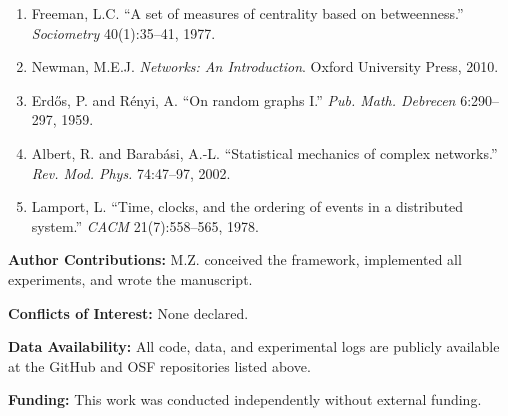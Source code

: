 \documentclass[11pt]{article}
\begin{document}
\begin{enumerate}
    \item Freeman, L.C. ``A set of measures of centrality based on betweenness.'' \emph{Sociometry} 40(1):35--41, 1977.
    \item Newman, M.E.J. \emph{Networks: An Introduction}. Oxford University Press, 2010.
    \item Erd\H{o}s, P. and R\'enyi, A. ``On random graphs I.'' \emph{Pub. Math. Debrecen} 6:290--297, 1959.
    \item Albert, R. and Barab\'asi, A.-L. ``Statistical mechanics of complex networks.'' \emph{Rev. Mod. Phys.} 74:47--97, 2002.
    \item Lamport, L. ``Time, clocks, and the ordering of events in a distributed system.'' \emph{CACM} 21(7):558--565, 1978.
\end{enumerate}

\vspace{1em}

\noindent\textbf{Author Contributions:} M.Z. conceived the framework, implemented all experiments, and wrote the manuscript.

\noindent\textbf{Conflicts of Interest:} None declared.

\noindent\textbf{Data Availability:} All code, data, and experimental logs are publicly available at the GitHub and OSF repositories listed above.

\noindent\textbf{Funding:} This work was conducted independently without external funding.
\end{document}
